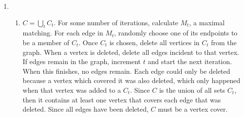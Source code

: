 \documentclass{article}
\begin{document}
\begin{enumerate}
\item \begin{enumerate}
\item $C = \bigcup_t C_t$. For some number of iterations, calculate $M_t$, a maximal matching.  For each edge in $M_t$, randomly choose one of its endpoints to be a member of $C_t$. Once $C_t$ is chosen, delete all vertices in $C_t$ from the graph.  When a vertex is deleted, delete all edges incident to that vertex. If edges remain in the graph, increment $t$ and start the next iteration. When this finishes, no edges remain.  Each edge could only be deleted because a vertex which covered it was also deleted, which only happened when that vertex was added to a $C_t$.  Since $C$ is the union of all sets $C_t$, then it contains at least one vertex that covers each edge that was deleted.  Since all edges have been deleted, $C$ must be a vertex cover.


\end{enumerate}
\end{enumerate}
\end{document}

